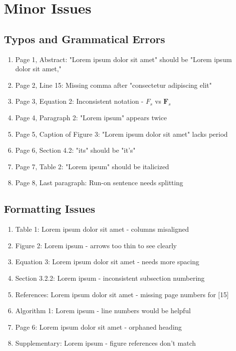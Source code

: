 \section{Minor Issues}
\label{sec:minor_issues}

\subsection{Typos and Grammatical Errors}
\begin{enumerate}
    \item Page 1, Abstract: "Lorem ipsum dolor sit amet" should be "Lorem ipsum dolor sit amet,"
    \item Page 2, Line 15: Missing comma after "consectetur adipiscing elit"
    \item Page 3, Equation 2: Inconsistent notation - $F_s$ vs $\mathbf{F}_s$
    \item Page 4, Paragraph 2: "Lorem ipsum" appears twice
    \item Page 5, Caption of Figure 3: "Lorem ipsum dolor sit amet" lacks period
    \item Page 6, Section 4.2: "its" should be "it's" 
    \item Page 7, Table 2: "Lorem ipsum" should be italicized
    \item Page 8, Last paragraph: Run-on sentence needs splitting
\end{enumerate}

\subsection{Formatting Issues}
\begin{enumerate}
    \item Table 1: Lorem ipsum dolor sit amet - columns misaligned
    \item Figure 2: Lorem ipsum - arrows too thin to see clearly
    \item Equation 3: Lorem ipsum dolor sit amet - needs more spacing
    \item Section 3.2.2: Lorem ipsum - inconsistent subsection numbering
    \item References: Lorem ipsum dolor sit amet - missing page numbers for [15]
    \item Algorithm 1: Lorem ipsum - line numbers would be helpful
    \item Page 6: Lorem ipsum dolor sit amet - orphaned heading
    \item Supplementary: Lorem ipsum - figure references don't match
\end{enumerate}

